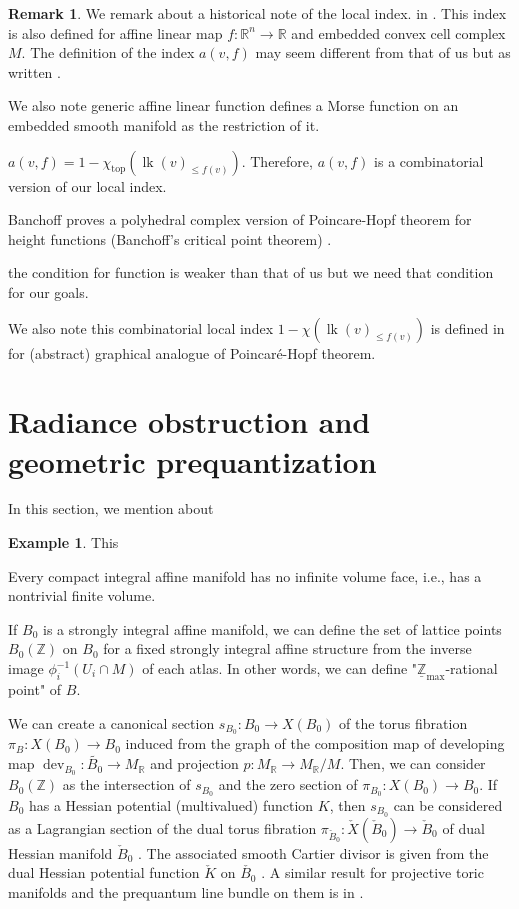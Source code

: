 \documentclass[a4paper,dvipdfmx,reqno,12pt]{amsart}
\theoremstyle{definition}
\newtheorem{Eg}[Thm]{Example}
\newtheorem{Rmk}[Thm]{Remark}
\newcommand{\R}{\mathbb{R}}%
\newcommand{\Z}{\mathbb{Z}}%
\newcommand{\opn}[1]{\operatorname{#1}}
\numberwithin{equation}{section}
\begin{document}
\begin{Rmk}
  We remark about a historical note of the local index.
  in \cite[p.246]{MR225327}.
  This index is also defined for affine linear map $f:\R^{n}\to \R$ and embedded convex cell complex
  $M$.
  The definition of the index $a(v,f)$
  may seem different from that of us but as written .

  We also note generic affine linear function defines a Morse function
  on an embedded smooth manifold as the restriction of it.

  $a(v,f)=1-\chi_{\mathrm{top}}(\opn{lk}(v)_{\leq f(v)})$. Therefore, $a(v,f)$ is a combinatorial version of our local index.

  Banchoff proves a polyhedral complex version of Poincare-Hopf theorem
  for height functions (Banchoff's critical point theorem) \cite[Theorem 1]{MR225327}.

  the condition for function is weaker than that of us but we need that condition for our goals.

  We also note this combinatorial local index $1-\chi(\opn{lk}(v)_{\leq f(v)})$ is defined in
  \cite[3]{knill2012graph}
  for (abstract) graphical analogue of Poincar\'e-Hopf theorem.
\end{Rmk}

\section{Radiance obstruction and geometric prequantization}
\label{sec: BSRR}
In this section, we mention about 

\begin{Eg}
This 
\end{Eg}

Every compact integral affine manifold has no infinite volume face,
 i.e., has a nontrivial finite volume.

If $B_0$ is a strongly integral affine manifold,
we can define the set of lattice points $B_0(\Z)$ 
on $B_0$ for a fixed strongly integral affine structure from 
the inverse image $\phi^{-1}_i(U_i\cap M)$ of each atlas.
In other words, we can define 
"$\underline{\Z}_{\max}$-rational point" of $B$.


We can create a canonical section 
$s_{B_0}\colon B_0 \to X(B_0)$ of the torus fibration
 $\pi_B:X(B_0)\to B_0$
induced from the graph of the composition map of developing map
$\opn{dev}_{B_0}\colon \widetilde{B_0}\to M_{\R}$ 
\cite[p.641]{goldmanRadianceObstructionParallel1984a} and projection
$p:M_{\R}\to M_{\R}/M$. 
Then, we can consider $B_0(\Z)$ as the intersection of 
$s_{B_0}$ and the zero section of $\pi_{B_0}:X(B_0)\to B_0$.
If $B_0$ has a Hessian potential (multivalued) function $K$, then $s_{B_0}$ can be 
considered as a Lagrangian section of the dual torus 
fibration $\pi_{\check{B}_0}\colon \check{X}(\check{B}_0)\to \check{B}_0$ of dual Hessian
manifold $\check{B}_0$ \cite[Proposition 6.9]{aspinwallDirichletBranesMirror2009}.
The associated smooth Cartier divisor is 
given from the dual Hessian potential function
$\check{K}$ on $\check{B_0}$ 
\cite[p.429]{aspinwallDirichletBranesMirror2009}.
A similar result for projective toric manifolds and the prequantum line bundle on them
is in \cite[Theorem 3.20]{yamaguchimaster}.
\end{document}
